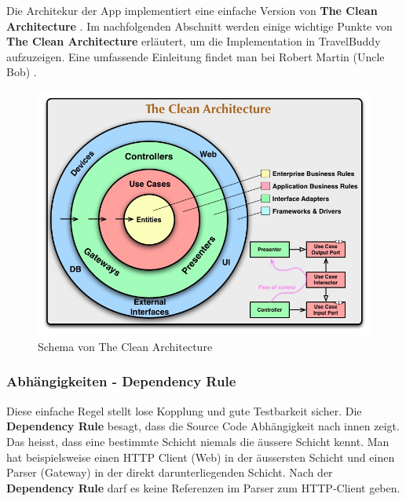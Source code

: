 \documentclass[a4paper,10pt,xetex]{article}
\begin{document}
Die Architekur der App implementiert eine einfache Version von \textbf{The Clean Architecture} \cite{TCA}.
Im nachfolgenden Abschnitt werden einige wichtige Punkte von \textbf{The Clean Architecture}
erläutert, um die Implementation in TravelBuddy aufzuzeigen. Eine umfassende
Einleitung findet man bei Robert Martin (Uncle Bob) \cite{CC}.
\begin{figure}
  \includegraphics{cleanarchitecture}
  \caption{Schema von The Clean Architecture}
\end{figure}

\subsubsection{Abhängigkeiten - Dependency Rule}\label{dependencyrule}
Diese einfache Regel stellt lose Kopplung und gute Testbarkeit sicher.
Die \textbf{Dependency Rule} besagt, dass die Source Code Abhängigkeit nach innen zeigt.
Das heisst, dass eine bestimmte Schicht niemals die äussere Schicht kennt.
Man hat beispielsweise einen HTTP Client (Web) in der äussersten Schicht und
einen Parser (Gateway) in der direkt darunterliegenden Schicht. Nach der
\textbf{Dependency Rule} darf es keine Referenzen im Parser zum HTTP-Client geben.
\end{document}
